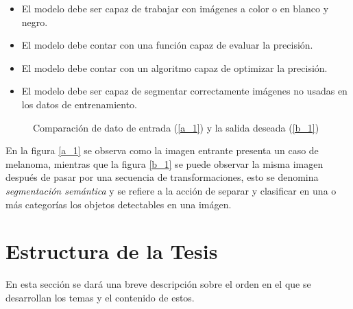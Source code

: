 \begin{itemize}
    \item El modelo debe ser capaz de trabajar con imágenes a color o en blanco y negro.
    \item El modelo debe contar con una función capaz de evaluar la precisión.
    \item El modelo debe contar con un algoritmo capaz de optimizar la precisión.
    \item El modelo debe ser capaz de segmentar correctamente imágenes no usadas en los datos de entrenamiento.
\end{itemize}

\begin{figure}[!htp]
    \centering
    \qquad
    \caption{Comparación de dato de entrada (\ref{a_1}) y la salida deseada (\ref{b_1})}
    \label{data_1}
\end{figure}

En la figura \ref{a_1} se observa como la imagen entrante presenta un caso de melanoma, mientras que la figura \ref{b_1} se puede observar la misma imagen después de pasar por una secuencia de transformaciones, esto se denomina \emph{segmentación semántica} y se refiere a la acción de separar y clasificar en una o más categorías los objetos detectables en una imágen.

\section{Estructura de la Tesis}
En esta sección se dará una breve descripción sobre el orden en el que se desarrollan los temas y el contenido de estos.

